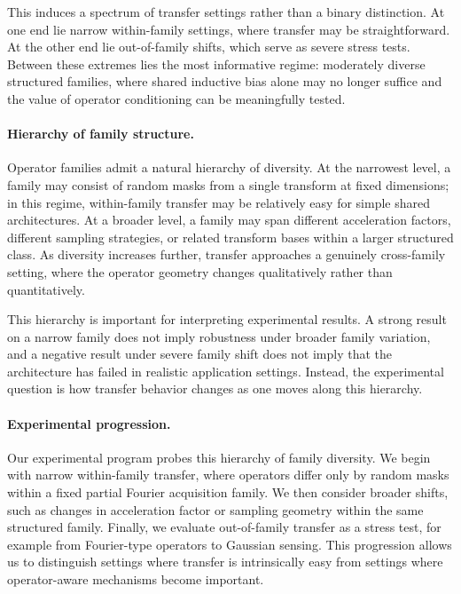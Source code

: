 \documentclass[11pt]{article}
\begin{document}
This induces a spectrum of transfer settings rather than a binary distinction. At one end lie narrow within-family settings, where transfer may be straightforward. At the other end lie out-of-family shifts, which serve as severe stress tests. Between these extremes lies the most informative regime: moderately diverse structured families, where shared inductive bias alone may no longer suffice and the value of operator conditioning can be meaningfully tested.

\paragraph{Hierarchy of family structure.}
Operator families admit a natural hierarchy of diversity. At the narrowest level, a family may consist of random masks from a single transform at fixed dimensions; in this regime, within-family transfer may be relatively easy for simple shared architectures. At a broader level, a family may span different acceleration factors, different sampling strategies, or related transform bases within a larger structured class. As diversity increases further, transfer approaches a genuinely cross-family setting, where the operator geometry changes qualitatively rather than quantitatively.

This hierarchy is important for interpreting experimental results. A strong result on a narrow family does not imply robustness under broader family variation, and a negative result under severe family shift does not imply that the architecture has failed in realistic application settings. Instead, the experimental question is how transfer behavior changes as one moves along this hierarchy.

\paragraph{Experimental progression.}
Our experimental program probes this hierarchy of family diversity. We begin with narrow within-family transfer, where operators differ only by random masks within a fixed partial Fourier acquisition family. We then consider broader shifts, such as changes in acceleration factor or sampling geometry within the same structured family. Finally, we evaluate out-of-family transfer as a stress test, for example from Fourier-type operators to Gaussian sensing. This progression allows us to distinguish settings where transfer is intrinsically easy from settings where operator-aware mechanisms become important.
\end{document}
